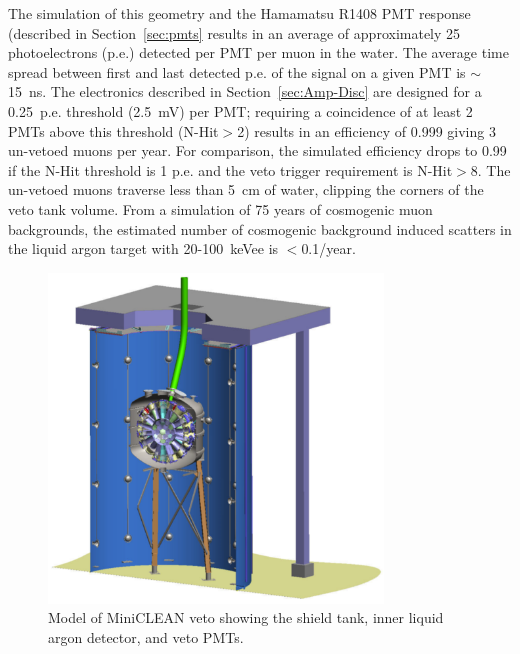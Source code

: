 \documentclass[review,number,sort&compress]{elsarticle}
\begin{document}
The simulation of this geometry and the Hamamatsu R1408 PMT response (described
in Section~\ref{sec:pmts} results in an average of approximately 25
photoelectrons (p.e.) detected per PMT per muon in the water. The
average time spread between first and last detected p.e. of the signal
on a given PMT is $\sim$15~ns. The electronics described in
Section~\ref{sec:Amp-Disc} are designed for a 0.25~p.e. threshold (2.5~mV)
per PMT; requiring a coincidence of at least 2 PMTs above this
threshold (N-Hit$>$2) results in an efficiency of 0.999 giving 3
un-vetoed muons per year. For comparison, the simulated efficiency
drops to 0.99 if the N-Hit threshold is 1 p.e. and the veto trigger
requirement is N-Hit$>$8. The un-vetoed muons traverse less than 5~cm
of water, clipping the corners of the veto tank volume. From a
simulation of 75 years of cosmogenic muon backgrounds, the estimated
number of cosmogenic background induced scatters in the liquid argon
target with 20-100~keVee is $<$0.1/year.

\begin{figure}[ht]
\begin{center}
\includegraphics[width=3.5in]{graphics/miniclean_overview_drawing.pdf}
\caption{Model of MiniCLEAN veto showing the shield tank, inner liquid argon detector, and veto PMTs.
\label{fig:veto_geom}}
\end{center}
\end{figure}
\end{document}
